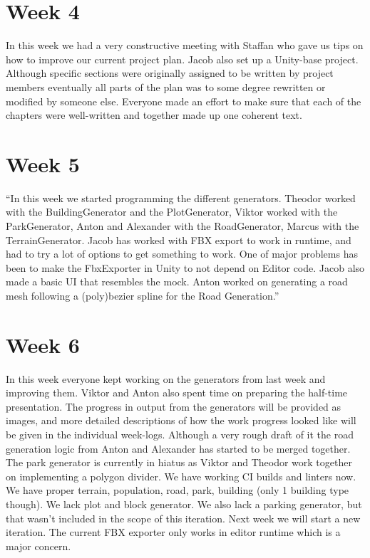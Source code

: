 \documentclass[11pt]{article}
\begin{document}
\section*{Week 4}
\label{sec:org8005ad0}
In this week we had a very constructive meeting with Staffan who gave us tips on
how to improve our current project plan. Jacob also set up a Unity-base project.
Although specific sections were originally assigned to be written by project
members eventually all parts of the plan was to some degree rewritten or
modified by someone else. Everyone made an effort to make sure that each of the
chapters were well-written and together made up one coherent text.

\section*{Week 5}
\label{sec:org378b96c}
``In this week we started programming the different generators. Theodor worked with the BuildingGenerator and the PlotGenerator, Viktor worked with the ParkGenerator, Anton and Alexander with the RoadGenerator, Marcus with the TerrainGenerator.
Jacob has worked with FBX export to work in runtime, and had to try a lot of
options to get something to work. One of major problems has been to make the
FbxExporter in Unity to not depend on Editor code. Jacob also made a basic UI
that resembles the mock. Anton worked on generating a road mesh following a
(poly)bezier spline for the Road Generation.''

\section*{Week 6}
\label{sec:orgcbf7955}
In this week everyone kept working on the generators from last week and
improving them. Viktor and Anton also spent time on preparing the half-time
presentation.  The progress in output from the generators will be provided as
images, and more detailed descriptions of how the work progress looked like will
be given in the individual week-logs. Although a very rough draft of it the road
generation logic from Anton and Alexander has started to be merged together. The
park generator is currently in hiatus as Viktor and Theodor work together on
implementing a polygon divider. We have working CI builds and linters now. We
have proper terrain, population, road, park, building (only 1 building type
though). We lack plot and block generator. We also lack a parking generator, but
that wasn't included in the scope of this iteration. Next week we will start a
new iteration. The current FBX exporter only works in editor runtime which is a
major concern.
\end{document}
